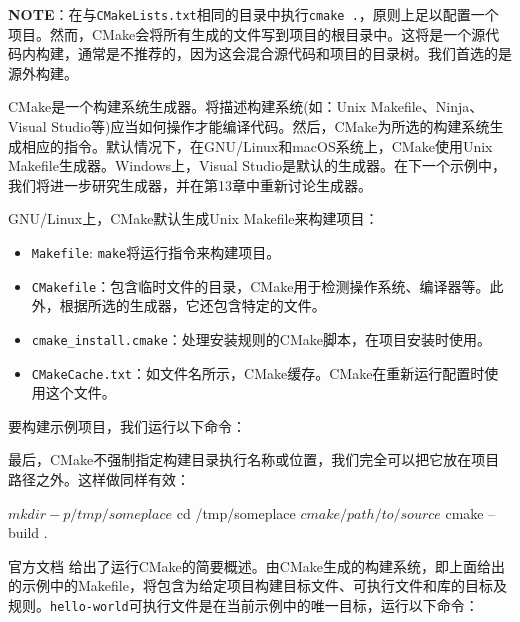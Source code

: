\begin{myInfoBox}
\textbf{NOTE}：在与\texttt{CMakeLists.txt}相同的目录中执行\texttt{cmake .}，原则上足以配置一个项目。然而，CMake会将所有生成的文件写到项目的根目录中。这将是一个源代码内构建，通常是不推荐的，因为这会混合源代码和项目的目录树。我们首选的是源外构建。
\end{myInfoBox}

CMake是一个构建系统生成器。将描述构建系统(如：Unix Makefile、Ninja、Visual Studio等)应当如何操作才能编译代码。然后，CMake为所选的构建系统生成相应的指令。默认情况下，在GNU/Linux和macOS系统上，CMake使用Unix Makefile生成器。Windows上，Visual Studio是默认的生成器。在下一个示例中，我们将进一步研究生成器，并在第13章中重新讨论生成器。

GNU/Linux上，CMake默认生成Unix Makefile来构建项目：

\begin{itemize}
\item \texttt{Makefile}: \texttt{make}将运行指令来构建项目。

\item \texttt{CMakefile}：包含临时文件的目录，CMake用于检测操作系统、编译器等。此外，根据所选的生成器，它还包含特定的文件。

\item \texttt{cmake\_install.cmake}：处理安装规则的CMake脚本，在项目安装时使用。

\item \texttt{CMakeCache.txt}：如文件名所示，CMake缓存。CMake在重新运行配置时使用这个文件。

\end{itemize}

要构建示例项目，我们运行以下命令：


最后，CMake不强制指定构建目录执行名称或位置，我们完全可以把它放在项目路径之外。这样做同样有效：

\begin{codebox}[shell]
$ mkdir -p /tmp/someplace
$ cd /tmp/someplace
$ cmake /path/to/source
$ cmake --build .
\end{codebox}


官方文档  给出了运行CMake的简要概述。由CMake生成的构建系统，即上面给出的示例中的Makefile，将包含为给定项目构建目标文件、可执行文件和库的目标及规则。\texttt{hello-world}可执行文件是在当前示例中的唯一目标，运行以下命令：

